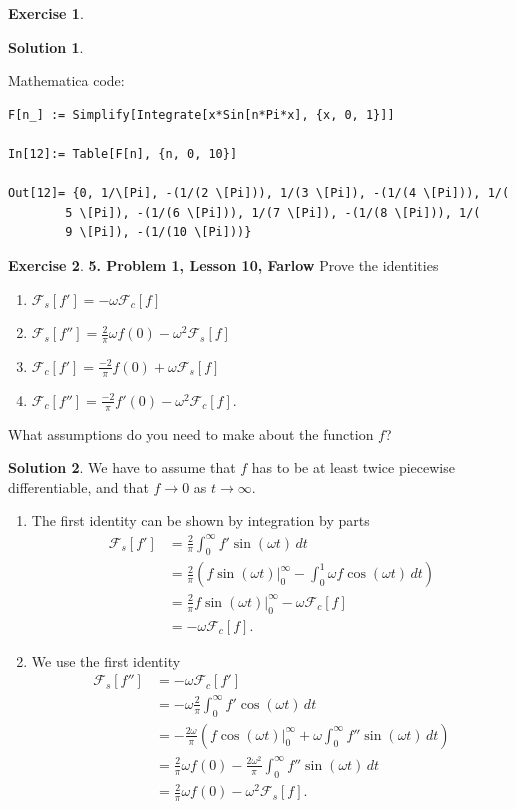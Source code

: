 \documentclass{article}
\theoremstyle{definition}
\newtheorem*{exer*}{Exercise}
\newtheorem*{sln*}{Solution}
\newcommand{\F}{\mathcal{F}}
\begin{document}
\begin{exer*}
\begin{sln*}
\begin{enumerate}
			Mathematica code:
			\begin{lstlisting}
F[n_] := Simplify[Integrate[x*Sin[n*Pi*x], {x, 0, 1}]]
			
In[12]:= Table[F[n], {n, 0, 10}]
			
Out[12]= {0, 1/\[Pi], -(1/(2 \[Pi])), 1/(3 \[Pi]), -(1/(4 \[Pi])), 1/(
		5 \[Pi]), -(1/(6 \[Pi])), 1/(7 \[Pi]), -(1/(8 \[Pi])), 1/(
		9 \[Pi]), -(1/(10 \[Pi]))}
			\end{lstlisting}
		\end{enumerate}
	\end{sln*}
\end{exer*}





\newpage

\begin{exer*}\textbf{5. Problem 1, Lesson 10, Farlow}
	Prove the identities
	\begin{enumerate}
		\item $\F_s[f'] = -\omega \F_c[f]$\\
		\item $\F_s[f''] = \frac{2}{\pi}\omega f(0) - \omega^2 \F_s[f]$\\
		\item $\F_c[f'] = \frac{-2}{\pi}f(0) + \omega\F_s[f]$\\
		\item $\F_c[f''] = \frac{-2}{\pi}f'(0) - \omega^2 \F_c[f]$.
	\end{enumerate}
	What assumptions do you need to make about the function $f$?
\begin{sln*}
	We have to assume that $f$ has to be at least twice piecewise differentiable, and that $f\to 0$ as $t\to \infty$.   
	\begin{enumerate}
		\item The first identity can be shown by integration by parts
		\begin{align*}
		\F_s[f'] &= \frac{2}{\pi}\int^\infty_0 f'\sin(\omega t)\,dt\\
		&= \frac{2}{\pi}\left( f\sin(\omega t)\bigg\vert^\infty_0 - \int^1_0 \omega f\cos(\omega t)\,dt \right)\\
		&= \frac{2}{\pi}f\sin(\omega t)\bigg\vert_0^\infty - \omega \F_c[f]\\
		&= -\omega \F_c[f].
		\end{align*}
		
		
		\item We use the first identity
		\begin{align*}
		 \F_s[f''] &= -\omega\F_c[f']\\
		 &= -\omega \frac{2}{\pi}\int^\infty_0 f'\cos(\omega t)\,dt\\
		 &= -\frac{2\omega}{\pi}\left( f\cos(\omega t)\bigg\vert^\infty_0 + \omega \int^\infty_0  f'' \sin(\omega t)\,dt  \right)\\
		 &= \frac{2}{\pi}\omega f(0) - \frac{2\omega^2}{\pi}\int^\infty_0 f''\sin(\omega t)\,dt\\
		 &= \frac{2}{\pi}\omega f(0) - \omega^2 \F_s[f].
		\end{align*}
		

\end{enumerate}
\end{sln*}
\end{exer*}
\end{document}
